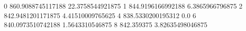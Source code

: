 0 860.9088745117188 22.3758544921875
1 844.9196166992188 6.3865966796875
2 842.9481201171875 4.41510009765625
4 838.5330200195312 0.0
6 840.0973510742188 1.5643310546875
8 842.359375 3.82635498046875
